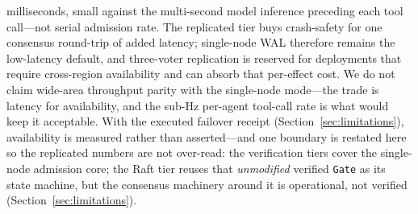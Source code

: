 \documentclass[10pt,journal,compsoc]{IEEEtran}
\begin{document}
milliseconds, small against the multi-second model inference preceding each
tool call---not serial admission rate.
The replicated tier buys crash-safety for one consensus round-trip of added
latency; single-node WAL therefore remains the low-latency default, and
three-voter replication is reserved for deployments that require cross-region
availability and can absorb that per-effect cost. We do not claim wide-area
throughput parity with the single-node mode---the trade is latency for
availability, and the sub-Hz per-agent tool-call rate is what would keep it
acceptable.
With the
executed failover receipt (Section~\ref{sec:limitations}), availability is
measured rather than asserted---and one boundary is restated here so the
replicated numbers are not over-read: the verification tiers cover the
single-node admission core; the Raft tier reuses that \emph{unmodified}
verified \texttt{Gate} as its state machine, but the consensus machinery
around it is operational, not verified (Section~\ref{sec:limitations}).
\end{document}
